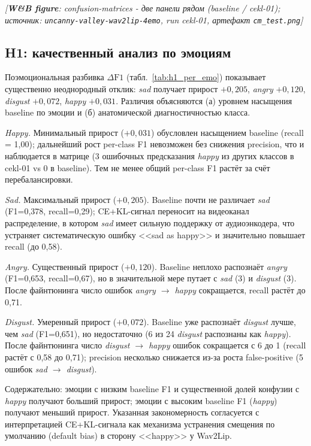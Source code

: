 \documentclass[a4paper, 12pt, oneside, openany]{article}
\begin{document}
\begin{center}
\textit{[\textbf{W\&B figure}: confusion-matrices - две панели рядом (baseline / cekl-01); источник: \texttt{uncanny-valley-wav2lip-4emo}, run cekl-01, артефакт \texttt{cm\_test.png}]}
\end{center}

\subsection{H1: качественный анализ по эмоциям}

Поэмоциональная разбивка $\Delta\mathrm{F1}$ (табл.~\ref{tab:h1_per_emo}) показывает существенно неоднородный отклик: \textit{sad} получает прирост $+0{,}205$, \textit{angry} $+0{,}120$, \textit{disgust} $+0{,}072$, \textit{happy} $+0{,}031$. Различия объясняются (а) уровнем насыщения baseline по эмоции и (б) анатомической диагностичностью класса.

\textit{Happy.} Минимальный прирост ($+0{,}031$) обусловлен насыщением baseline (recall = 1,00); дальнейший рост per-class F1 невозможен без снижения precision, что и наблюдается в матрице (3 ошибочных предсказания \textit{happy} из других классов в cekl-01 vs 0 в baseline). Тем не менее общий per-class F1 растёт за счёт перебалансировки.

\textit{Sad.} Максимальный прирост ($+0{,}205$). Baseline почти не различает \textit{sad} (F1=0,378, recall=0,29); CE+KL-сигнал переносит на видеоканал распределение, в котором \textit{sad} имеет сильную поддержку от аудиоэнкодера, что устраняет систематическую ошибку <<sad as happy>> и значительно повышает recall (до 0,58).

\textit{Angry.} Существенный прирост ($+0{,}120$). Baseline неплохо распознаёт \textit{angry} (F1=0,653, recall=0,67), но в значительной мере путает с \textit{sad} (3) и \textit{disgust} (3). После файнтюнинга число ошибок \textit{angry $\to$ happy} сокращается, recall растёт до 0,71.

\textit{Disgust.} Умеренный прирост ($+0{,}072$). Baseline уже распознаёт \textit{disgust} лучше, чем \textit{sad} (F1=0,651), но недостаточно (6 из 24 \textit{disgust} распознаны как \textit{happy}). После файнтюнинга число \textit{disgust $\to$ happy} ошибок сокращается с 6 до 1 (recall растёт с 0,58 до 0,71); precision несколько снижается из-за роста false-positive (5 ошибок \textit{sad $\to$ disgust}).

Содержательно: эмоции с низким baseline F1 и существенной долей конфузии с \textit{happy} получают больший прирост; эмоции с высоким baseline F1 (\textit{happy}) получают меньший прирост. Указанная закономерность согласуется с интерпретацией CE+KL-сигнала как механизма устранения смещения по умолчанию (default bias) в сторону <<happy>> у Wav2Lip.
\end{document}
